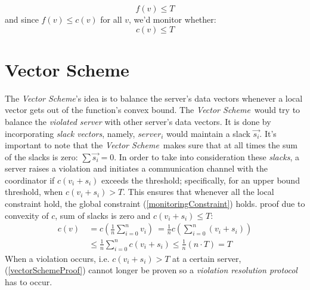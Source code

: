 \documentclass[10pt, conference]{IEEEtran}
\newcommand{\vectorScheme}{\textit{Vector Scheme}}
\begin{document}
\begin{equation}
f(v) \leq T
\end{equation}
and since ${f(v) \leq c(v)}$ for all $v$, we'd monitor whether:
\begin{equation}
\label{monitoringConstraint}
c(v) \leq T
\end{equation}

\section{Vector Scheme}
The \vectorScheme 's idea is to balance the server's data vectors whenever a local vector gets out of the function's convex bound. The \vectorScheme \ would try to balance the \textit{violated server} with other server's data vectors. It is done by incorporating \textit{slack vectors}, namely, $server_i$ would maintain a slack $\overrightarrow{s_i}$. It's important to note that the \vectorScheme \  makes sure that at all times the sum of the slacks is zero: ${\sum{\overrightarrow{s_i}} = 0}$.
In order to take into consideration these \textit{slacks}, a server raises a violation and initiates a communication channel with the coordinator if ${c(v_i+s_i)}$ exceeds the threshold; specifically, for an upper bound threshold, when ${c(v_i+s_i) > T}$. This ensures that whenever all the local constraint hold, the global constraint (\ref{monitoringConstraint}) holds. proof due to convexity of $c$, sum of slacks is zero and ${c(v_i+s_i) \leq T}$:
\begin{equation}
\label{vectorSchemeProof}
\begin{aligned}
 c(v)  \
	   &=  c\left(\frac{1}{n} \sum\limits_{i=0}^{n}{v_i}\right)  \
        =  \frac{1}{n} c\left(\sum\limits_{i=0}^{n}{(v_i + s_i)}\right) \\
      &\leq   \frac{1}{n} \sum\limits_{i=0}^{n}{c(v_i + s_i)}
       \leq   \frac{1}{n}(n \cdot T)
       = T
\end{aligned}
\end{equation}
When a violation occurs, i.e. ${c(v_i+s_i) > T}$ at a certain server, (\ref{vectorSchemeProof}) cannot longer be proven so a \textit{violation resolution protocol} has to occur.
\end{document}
